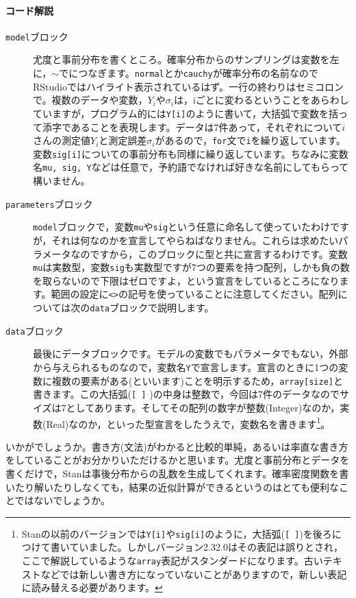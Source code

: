 \documentclass{ltjsbook}
\begin{document}
\paragraph{コード解説}
\begin{description}
	\item[\texttt{model}ブロック] 尤度と事前分布を書くところ。確率分布からのサンプリングは変数を左に，$\sim$でにつなぎます。\texttt{normal}とか\texttt{cauchy}が確率分布の名前なのでRStudioではハイライト表示されているはず。一行の終わりはセミコロンで。複数のデータや変数，$Y_i$や$\sigma_i$は，iごとに変わるということをあらわしていますが，プログラム的には\verb|Y[i]|のように書いて，大括弧で変数を括って添字であることを表現します。データは7件あって，それぞれについて$i$さんの測定値$Y_i$と測定誤差$\sigma_i$があるので，\texttt{for}文で\verb|i|を繰り返しています。変数\verb|sig[i]|についての事前分布も同様に繰り返しています。ちなみに変数名\texttt{mu, sig, Y}などは任意で，予約語でなければ好きな名前にしてもらって構いません。
	\item[\texttt{parameters}ブロック] \texttt{model}ブロックで，変数\texttt{mu}や\texttt{sig}という任意に命名して使っていたわけですが，それは何なのかを宣言してやらねばなりません。これらは求めたいパラメータなのですから，このブロックに型と共に宣言するわけです。変数\verb|mu|は実数型，変数\verb|sig|も実数型ですが7つの要素を持つ配列，しかも負の数を取らないので下限はゼロですよ，という宣言をしているところになります。範囲の設定に\verb|<>|の記号を使っていることに注意してください。配列については次の\texttt{data}ブロックで説明します。
	\item[\texttt{data}ブロック] 最後にデータブロックです。モデルの変数でもパラメータでもない，外部から与えられるものなので，変数名\verb|Y|で宣言します。宣言のときに1つの変数に複数の要素がある(といいます)ことを明示するため，\verb|array[size]|と書きます。この大括弧(\verb|[ ]| )の中身は整数で，今回は7件のデータなのでサイズは7としてあります。そしてその配列の数字が整数(Integer)なのか，実数(Real)なのか，といった型宣言をしたうえで，変数名を書きます\footnote{Stanの以前のバージョンでは\verb|Y[i]|や\verb|sig[i]|のように，大括弧(\verb|[ ]|)を後ろにつけて書いていました。しかしバージョン2.32.0はその表記は誤りとされ，ここで解説しているような\verb|array|表記がスタンダードになります。古いテキストなどでは新しい書き方になっていないことがありますので，新しい表記に読み替える必要があります。}。
\end{description}

いかがでしょうか。書き方(文法)がわかると比較的単純，あるいは率直な書き方をしていることがお分かりいただけるかと思います。尤度と事前分布とデータを書くだけで，Stanは事後分布からの乱数を生成してくれます。確率密度関数を書いたり解いたりしなくても，結果の近似計算ができるというのはとても便利なことではないでしょうか。
\end{document}
